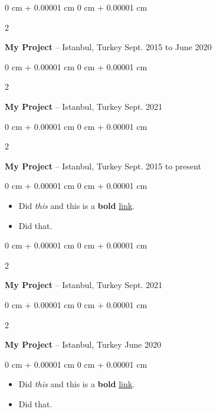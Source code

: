 \documentclass[10pt, letterpaper]{article}
\newenvironment{highlights}{
    \begin{itemize}[
        topsep=0.10 cm,
        parsep=0.10 cm,
        partopsep=0pt,
        itemsep=0pt,
        leftmargin=0 cm + 10pt
    ]
}{
    \end{itemize}
} %
\newenvironment{onecolentry}{
    \begin{adjustwidth}{
        0 cm + 0.00001 cm
    }{
        0 cm + 0.00001 cm
    }
}{
    \end{adjustwidth}
} %
\newenvironment{twocolentry}[2][]{
    \onecolentry
    \def\secondColumn{#2}
    \setcolumnwidth{\fill, 4.5 cm}
    \begin{paracol}{2}
}{
    \switchcolumn \raggedleft \secondColumn
    \end{paracol}
    \endonecolentry
} %
\begin{document}
        \vspace{0.2 cm}

        \begin{twocolentry}{
            Sept. 2015 to June 2020
        }
            \textbf{My Project} -- Istanbul, Turkey\end{twocolentry}



        \vspace{0.2 cm}

        \begin{twocolentry}{
            Sept. 2021
        }
            \textbf{My Project} -- Istanbul, Turkey\end{twocolentry}



        \vspace{0.2 cm}

        \begin{twocolentry}{
            Sept. 2015 to present
        }
            \textbf{My Project} -- Istanbul, Turkey\end{twocolentry}

        \vspace{0.10 cm}
        \begin{onecolentry}
            \begin{highlights}
                \item Did \textit{this} and this is a \textbf{bold} \href{https://example.com}{link}.
                \item Did that.
            \end{highlights}
        \end{onecolentry}


        \vspace{0.2 cm}

        \begin{twocolentry}{
            Sept. 2021
        }
            \textbf{My Project} -- Istanbul, Turkey\end{twocolentry}



        \vspace{0.2 cm}

        \begin{twocolentry}{
            June 2020
        }
            \textbf{My Project} -- Istanbul, Turkey\end{twocolentry}

        \vspace{0.10 cm}
        \begin{onecolentry}
            \begin{highlights}
                \item Did \textit{this} and this is a \textbf{bold} \href{https://example.com}{link}.
                \item Did that.
            \end{highlights}
        \end{onecolentry}
\end{document}
